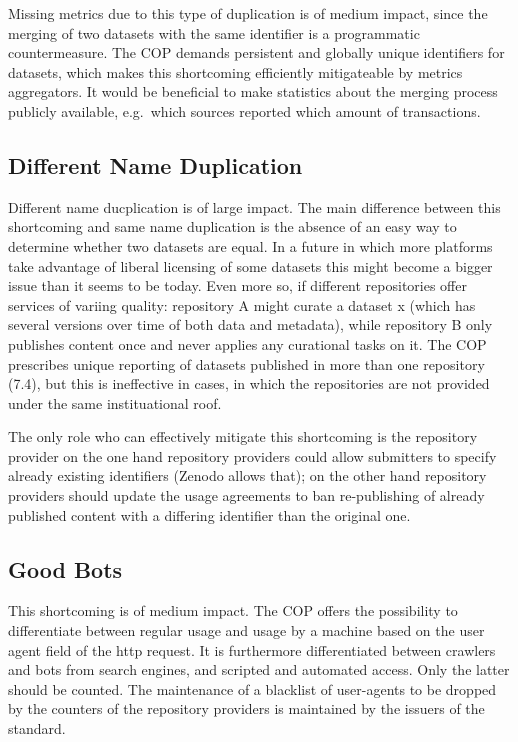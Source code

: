 \documentclass[conference, a4paper]{IEEEtran}\usepackage[]{graphicx}\usepackage[]{color}
\begin{document}
Missing metrics due to this type of duplication is of medium impact,
since the merging of two datasets with the same identifier is a programmatic countermeasure.
The COP demands persistent and globally unique
identifiers for datasets, which makes this shortcoming efficiently mitigateable
by metrics aggregators.
It would be beneficial to make statistics about the merging process publicly available,
e.g.\ which sources reported which amount of transactions.

\subsection{Different Name Duplication}
Different name ducplication is of large impact.
The main difference between this shortcoming and same name duplication is
the absence of an easy way to determine whether two datasets are equal.
In a future in which more platforms take advantage of liberal licensing of
some datasets this might become a bigger issue than it seems to be today.
Even more so, if different repositories offer services of variing quality:
repository A might curate a dataset x (which has several versions over time
of both data and metadata),
while repository B only publishes content once and never applies any curational
tasks on it.
The COP prescribes unique reporting of datasets published in more than one repository (7.4),
but this is ineffective in cases, in which the repositories are not provided under the
same instituational roof.

The only role who can effectively mitigate this shortcoming is the repository provider
on the one hand repository providers could allow submitters to specify already
existing identifiers (Zenodo allows that);
on the other hand repository providers should update the usage agreements to
ban re-publishing of already published content with a differing
identifier than the original one.

\subsection{Good Bots}

This shortcoming is of medium impact.
The COP offers the possibility to differentiate between regular usage
and usage by a machine based on the user agent field of the http request.
It is furthermore differentiated between crawlers and bots from search engines,
and scripted and automated access. Only the latter should be counted.
The maintenance of a blacklist of user-agents to be dropped by the counters
of the repository providers is maintained by the issuers of the standard.
\end{document}
